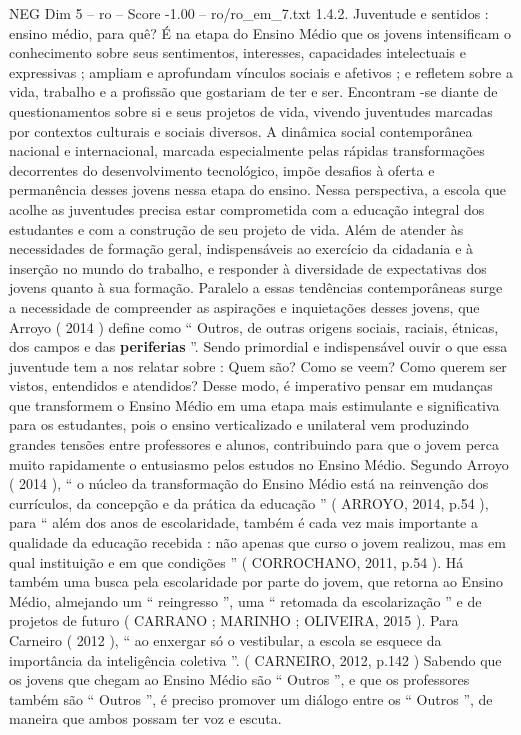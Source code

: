 \begin{textsample}{NEG Dim 5 – ro – Score -1.00 – ro/ro\_em\_7.txt}  \label{ex:f5_neg_179}
1.4.2.
Juventude e sentidos : ensino médio, para quê?
É na etapa do Ensino Médio que os jovens intensificam o conhecimento sobre seus sentimentos, interesses, capacidades intelectuais e expressivas ; ampliam e aprofundam vínculos sociais e afetivos ; e refletem sobre a vida, trabalho e a profissão que gostariam de ter e ser.
Encontram -se diante de questionamentos sobre si e seus projetos de vida, vivendo juventudes marcadas por contextos culturais e sociais diversos.
A dinâmica social contemporânea nacional e internacional, marcada especialmente pelas rápidas transformações decorrentes do desenvolvimento tecnológico, impõe desafios à oferta e permanência desses jovens nessa etapa do ensino.
Nessa perspectiva, a escola que acolhe as juventudes precisa estar comprometida com a educação integral dos estudantes e com a construção de seu projeto de vida.
Além de atender às necessidades de formação geral, indispensáveis ao exercício da cidadania e à inserção no mundo do trabalho, e responder à diversidade de expectativas dos jovens quanto à sua formação.
Paralelo a essas tendências contemporâneas surge a necessidade de compreender as aspirações e inquietações desses jovens, que Arroyo ( 2014 ) define como “ Outros, de outras origens sociais, raciais, étnicas, dos campos e das \textbf{periferias} ”.
Sendo primordial e indispensável ouvir o que essa juventude tem a nos relatar sobre : Quem são?
Como se veem?
Como querem ser vistos, entendidos e atendidos?
Desse modo, é imperativo pensar em mudanças que transformem o Ensino Médio em uma etapa mais estimulante e significativa para os estudantes, pois o ensino verticalizado e unilateral vem produzindo grandes tensões entre professores e alunos, contribuindo para que o jovem perca muito rapidamente o entusiasmo pelos estudos no Ensino Médio.
Segundo Arroyo ( 2014 ), “ o núcleo da transformação do Ensino Médio está na reinvenção dos currículos, da concepção e da prática da educação ” ( ARROYO, 2014, p.54 ), para “ além dos anos de escolaridade, também é cada vez mais importante a qualidade da educação recebida : não apenas que curso o jovem realizou, mas em qual instituição e em que condições ” ( CORROCHANO, 2011, p.54 ).
Há também uma busca pela escolaridade por parte do jovem, que retorna ao Ensino Médio, almejando um “ reingresso ”, uma “ retomada da escolarização ” e de projetos de futuro ( CARRANO ; MARINHO ; OLIVEIRA, 2015 ).
Para Carneiro ( 2012 ), “ ao enxergar só o vestibular, a escola se esquece da importância da inteligência coletiva ”. ( CARNEIRO, 2012, p.142 ) Sabendo que os jovens que chegam ao Ensino Médio são “ Outros ”, e que os professores também são “ Outros ”, é preciso promover um diálogo entre os “ Outros ”, de maneira que ambos possam ter voz e escuta.

\end{textsample}
